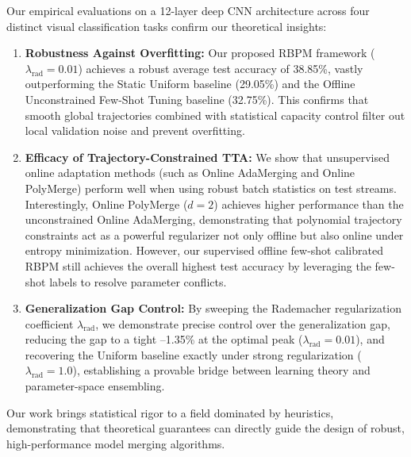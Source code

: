 Our empirical evaluations on a 12-layer deep CNN architecture across four distinct visual classification tasks confirm our theoretical insights:
\begin{enumerate}
    \item \textbf{Robustness Against Overfitting:} Our proposed RBPM framework ($\lambda_{\text{rad}} = 0.01$) achieves a robust average test accuracy of 38.85\%, vastly outperforming the Static Uniform baseline (29.05\%) and the Offline Unconstrained Few-Shot Tuning baseline (32.75\%). This confirms that smooth global trajectories combined with statistical capacity control filter out local validation noise and prevent overfitting.
    \item \textbf{Efficacy of Trajectory-Constrained TTA:} We show that unsupervised online adaptation methods (such as Online AdaMerging and Online PolyMerge) perform well when using robust batch statistics on test streams. Interestingly, Online PolyMerge ($d=2$) achieves higher performance than the unconstrained Online AdaMerging, demonstrating that polynomial trajectory constraints act as a powerful regularizer not only offline but also online under entropy minimization. However, our supervised offline few-shot calibrated RBPM still achieves the overall highest test accuracy by leveraging the few-shot labels to resolve parameter conflicts.
    \item \textbf{Generalization Gap Control:} By sweeping the Rademacher regularization coefficient $\lambda_{\text{rad}}$, we demonstrate precise control over the generalization gap, reducing the gap to a tight --1.35\% at the optimal peak ($\lambda_{\text{rad}}=0.01$), and recovering the Uniform baseline exactly under strong regularization ($\lambda_{\text{rad}}=1.0$), establishing a provable bridge between learning theory and parameter-space ensembling.
\end{enumerate}
Our work brings statistical rigor to a field dominated by heuristics, demonstrating that theoretical guarantees can directly guide the design of robust, high-performance model merging algorithms.